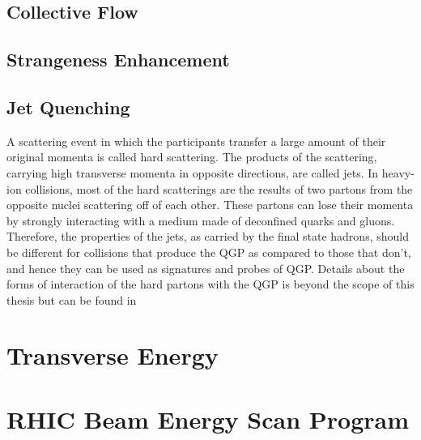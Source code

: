 \subsection{Collective Flow}
\subsection{Strangeness Enhancement}
\subsection{Jet Quenching}
A scattering event in which the participants transfer a large amount of their original momenta is called hard scattering. The products of the scattering, carrying high transverse momenta in opposite directions, are called jets. In heavy-ion collisions, most of the hard scatterings are the results of two partons from the opposite nuclei scattering off of each other. These partons can lose their momenta by strongly interacting with a medium made of deconfined quarks and gluons. Therefore, the properties of the jets, as carried by the final state hadrons, should be different for collisions that produce the QGP as compared to those that don't, and hence they can be used as signatures and probes of QGP. Details about the forms of interaction of the hard partons with the QGP is beyond the scope of this thesis but can be found in 


\section{Transverse Energy}
\section{RHIC Beam Energy Scan Program}
